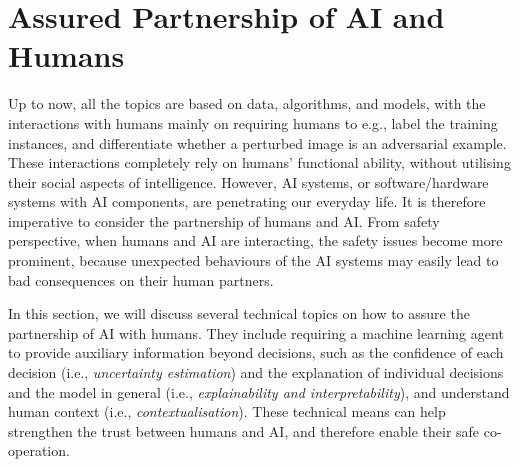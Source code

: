 \section{Assured Partnership of AI and Humans}\label{sec:assuredPartnership}

Up to now, all the topics are based on data, algorithms, and models, with the interactions with humans mainly on requiring humans to e.g., label the training instances, and differentiate whether a perturbed image is an adversarial example. These interactions completely rely on humans' functional ability, without utilising their social aspects of intelligence. However, AI systems, or software/hardware systems with AI components, are penetrating our everyday life. It is therefore imperative to consider the partnership of humans and AI. 
From safety perspective, when humans and AI are interacting, the safety issues become more prominent, because unexpected behaviours of the AI systems may easily lead to bad consequences on their human partners.  

In this section, we will discuss several technical topics on how to assure the partnership of AI with humans. They include requiring a machine learning agent to provide auxiliary information beyond decisions, such as the confidence of each decision (i.e., \emph{uncertainty estimation}) and the explanation of individual decisions and the model in general (i.e., \emph{explainability and interpretability}), and understand human context (i.e., \emph{contextualisation}). These technical means can help strengthen the trust between humans and AI, and therefore enable their safe co-operation. 